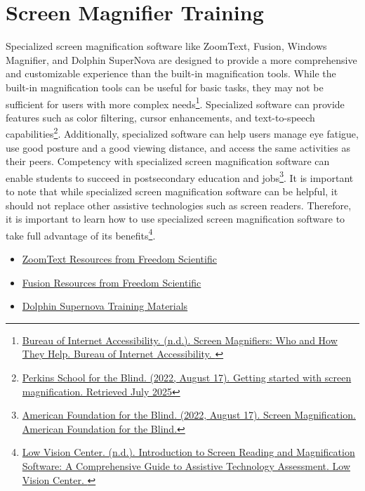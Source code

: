 \hypertarget{appx11}{}\section[Screen Magnifier Training]{Screen Magnifier Training}\label{appx11}
Specialized screen magnification software like ZoomText, Fusion, Windows Magnifier, and Dolphin SuperNova are designed to provide a more comprehensive and customizable experience than the built-in magnification tools. While the built-in magnification tools can be useful for basic tasks, they may not be sufficient for users with more complex needs\footnote{\raggedright \href{https://www.boia.org/blog/screen-magnifiers-who-and-how-they-help}{Bureau of Internet Accessibility. (n.d.). Screen Magnifiers: Who and How They Help. Bureau of Internet Accessibility. }}. Specialized software can provide features such as color filtering, cursor enhancements, and text-to-speech capabilities\footnote{\raggedright \href{https://www.perkins.org/resource/getting-started-screen-magnification/}{Perkins School for the Blind. (2022, August 17). Getting started with screen magnification. Retrieved July 2025}}. Additionally, specialized software can help users manage eye fatigue, use good posture and a good viewing distance, and access the same activities as their peers. Competency with specialized screen magnification software can enable students to succeed in postsecondary education and jobs\footnote{\raggedright \href{https://www.afb.org/blindness-and-low-vision/using-technology/screen-magnification}{American Foundation for the Blind. (2022, August 17). Screen Magnification. American Foundation for the Blind.}}. It is important to note that while specialized screen magnification software can be helpful, it should not replace other assistive technologies such as screen readers. Therefore, it is important to learn how to use specialized screen magnification software to take full advantage of its benefits\footnote{\raggedright \href{https://nelowvision.com/introduction-to-screen-reading-and-magnification-software-a-comprehensive-guide-to-assistive-technology-assessment/}{Low Vision Center. (n.d.). Introduction to Screen Reading and Magnification Software: A Comprehensive Guide to Assistive Technology Assessment. Low Vision Center. }}.
\begin{itemize}
 \item \href{https://support.freedomscientific.com/teachers/resources/ZoomText\_resources.zip}{ZoomText Resources from Freedom Scientific}
 \item \href{https://support.freedomscientific.com/teachers/resources/Fusion\_resources.zip}{Fusion Resources from Freedom Scientific}
 \item \href{https://yourdolphin.com/support/tutorials}{Dolphin Supernova Training Materials}
\end{itemize}

